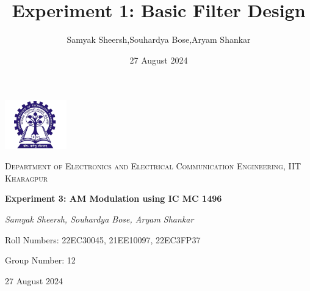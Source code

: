 \documentclass{article}
\title{Experiment 1: Basic Filter Design}
\author{Samyak Sheersh,Souhardya Bose,Aryam Shankar}
\date{27 August 2024}
\begin{document}
\begin{titlepage}
    \centering
    \includegraphics[width=0.2\textwidth]{KGP_logo.png}\par\vspace{1cm}
    {\scshape\LARGE Department of Electronics and Electrical Communication Engineering, IIT Kharagpur\par}
    \vspace{1cm}
    {\huge\bfseries Experiment 3: AM Modulation using IC MC 1496\par}
    \vspace{1.5cm}
    {\Large\itshape Samyak Sheersh, Souhardya Bose, Aryam Shankar\par}
    \vfill
    {\large Roll Numbers: 22EC30045, 21EE10097, 22EC3FP37\par}
    {\large Group Number: 12\par}
    \vfill
    {\large 27 August 2024\par}
\end{titlepage}
\end{document}
